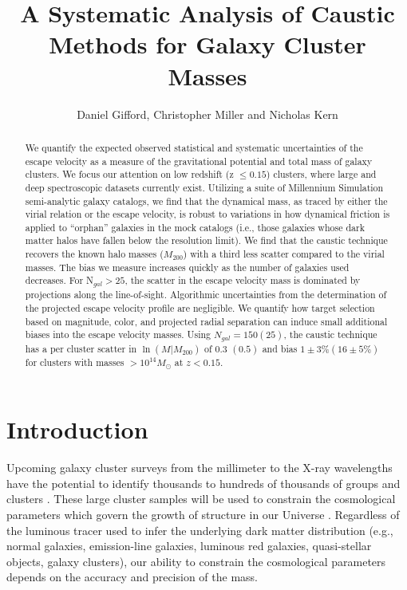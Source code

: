 \documentclass[iop]{emulateapj}
\begin{document}
\title{A Systematic Analysis of Caustic Methods for Galaxy Cluster Masses}
\author{Daniel Gifford, Christopher Miller and Nicholas Kern}

\begin{abstract}

We quantify the expected observed statistical and systematic uncertainties of the escape velocity as a measure of the gravitational potential and total mass of galaxy clusters. We focus our attention on low redshift (z $\le 0.15$) clusters, where large and deep spectroscopic datasets currently exist.  Utilizing a suite of Millennium Simulation semi-analytic galaxy catalogs, we find that the dynamical mass, as traced by either the virial relation or the escape velocity, is robust to variations in how dynamical friction is applied to ``orphan'' galaxies in the mock catalogs (i.e., those galaxies whose dark matter halos have fallen below the resolution limit). We find that the caustic technique recovers the known halo masses ($M_{200}$) with a third less scatter compared to the virial masses. The bias we measure increases quickly as the number of galaxies used decreases. For N$_{gal} > 25$, the scatter in the escape velocity mass is dominated by projections along the line-of-sight. Algorithmic uncertainties from the determination of the projected escape velocity profile are negligible. We quantify how target selection based on magnitude, color, and projected radial separation can induce small additional biases into the escape velocity masses. Using $N_{gal} = 150 (25)$, the caustic technique has a per cluster scatter in $\ln(M|M_{200})$ of $0.3$ $(0.5)$ and bias $1\pm{3\%} (16\pm{5\%})$  for clusters with masses $> 10^{14}M_{\odot}$ at $z<0.15$.

\end{abstract}

\section{Introduction}
\label{sec:intro}

Upcoming galaxy cluster surveys from the millimeter to the X-ray wavelengths have the potential to identify thousands to hundreds of thousands of groups and clusters \citep{Song12,Pillepich12}. These large cluster samples will be used to constrain the cosmological parameters which govern the growth of structure in our Universe \citep{Miller01a, Miller01b, Rozo09a, Vikhlinin09, Benson11}. Regardless of the luminous tracer used to infer the underlying dark matter distribution (e.g., normal galaxies, emission-line galaxies,  luminous red galaxies, quasi-stellar objects, galaxy clusters), our ability to constrain the cosmological parameters depends on the accuracy and precision of the mass.
\end{document}
